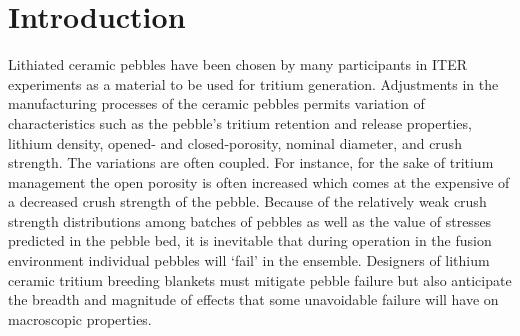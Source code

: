 \chapter{Introduction} \label{intro}

Lithiated ceramic pebbles have been chosen by many participants in ITER experiments as a material to be used for tritium generation\cite{Lulewicz2002, Mandal2012a, Tsuchiya1998, Cho2012}. Adjustments in the manufacturing processes of the ceramic pebbles permits variation of characteristics such as the pebble's tritium retention and release properties, lithium density, opened- and closed-porosity, nominal diameter, and crush strength. The variations are often coupled. For instance, for the sake of tritium management the open porosity is often increased which comes at the expensive of a decreased crush strength of the pebble. Because of the relatively weak crush strength distributions among batches of pebbles as well as the value of stresses predicted in the pebble bed, it is inevitable that during operation in the fusion environment individual pebbles will `fail' in the ensemble. Designers of lithium ceramic tritium breeding blankets must mitigate pebble failure but also anticipate the breadth and magnitude of effects that some unavoidable failure will have on macroscopic properties.


